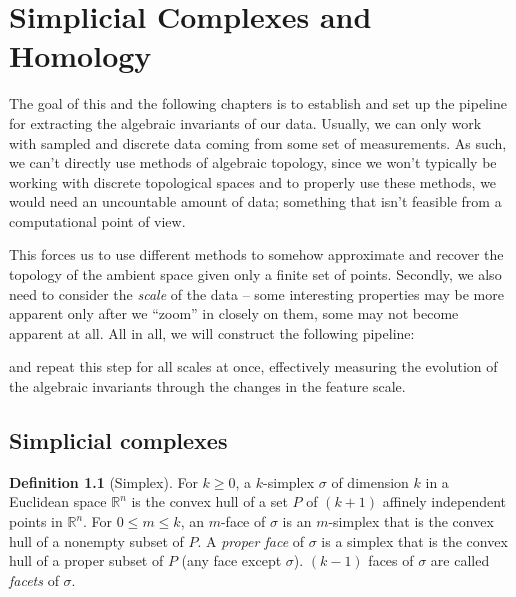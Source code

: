 \chapter{Simplicial Complexes and Homology}
\graphicspath{ {/home/tomasp/Dokumenty/Master_Thesis/figures/} }
\theoremstyle{definition}
\newtheorem{definition}{Definition}[section]
\newtheorem{theorem}{Theorem}[section]
\newtheorem{lemma}{Lemma}[section]
\newtheorem{corollary}{Corollary}[section]
\newtheorem{example}{Example}[section]
\newtheorem*{remark}{Remark}

The goal of this and the following chapters is to establish and set up the pipeline for extracting the algebraic invariants of our data. Usually, we can only work with sampled and discrete data coming from some set of measurements. As such, we can't directly use methods of algebraic topology, since we won't typically be working with discrete topological spaces and to properly use these methods, we would need an uncountable amount of data; something that isn't feasible from a computational point of view.
\par
This forces us to use different methods to somehow approximate and recover the topology of the ambient space given only a finite set of points. Secondly, we also need to consider the \textit{scale} of the data -- some interesting properties may be more apparent only after we ``zoom'' in closely on them, some may not become apparent at all. All in all, we will construct the following pipeline:

\begin{center}
\end{center}

and repeat this step for all scales at once, effectively measuring the evolution of the algebraic invariants through the changes in the feature scale.

\section{Simplicial complexes}
\begin{definition}[Simplex]
For $k \geq 0$, a $k$-simplex $\sigma$ of dimension $k$ in a Euclidean space $\mathbb{R}^{n}$ is the convex hull of a set $P$ of $(k+1)$ affinely independent points in $\mathbb{R}^{n}$. For $0 \leq m \leq k$, an $m$-face of $\sigma$ is an $m$-simplex that is the convex hull of a nonempty subset of $P$. A \textit{proper face} of $\sigma$ is a simplex that is the convex hull of a proper subset of $P$ (any face except $\sigma$). $(k-1)$ faces of $\sigma$ are called \textit{facets} of $\sigma$.
\end{definition}

